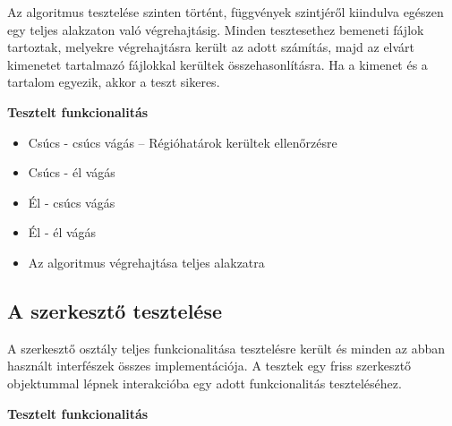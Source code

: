 Az algoritmus tesztelése szinten történt, függvények szintjéről kiindulva egészen egy teljes alakzaton való végrehajtásig. Minden tesztesethez bemeneti fájlok tartoztak, melyekre végrehajtásra került az adott számítás, majd az elvárt kimenetet tartalmazó fájlokkal kerültek összehasonlításra. Ha a kimenet és a tartalom egyezik, akkor a teszt sikeres.

\textbf{Tesztelt funkcionalitás}

\begin{itemize}
	\item Csúcs - csúcs vágás -- Régióhatárok kerültek ellenőrzésre
	\item Csúcs - él vágás
	\item Él - csúcs vágás
	\item Él - él vágás
	\item Az algoritmus végrehajtása teljes alakzatra
\end{itemize}


\subsection{A szerkesztő tesztelése}

A szerkesztő osztály teljes funkcionalitása tesztelésre került és minden az abban használt interfészek összes implementációja. A tesztek egy friss szerkesztő objektummal lépnek interakcióba egy adott funkcionalitás teszteléséhez.

\textbf{Tesztelt funkcionalitás}

